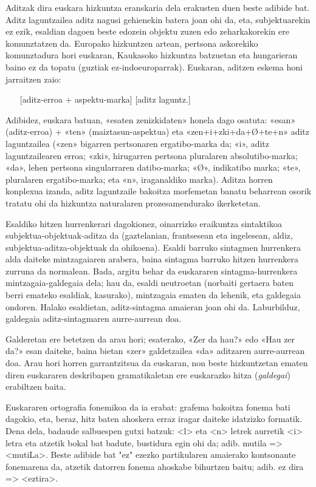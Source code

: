 \begin{multicols}{2}
Aditzak dira euskara hizkuntza eranskaria dela erakusten duen beste adibide bat. Aditz laguntzailea aditz nagusi gehienekin batera joan ohi da, eta, subjektuarekin ez ezik, esaldian dagoen beste edozein objektu zuzen edo zeharkakorekin ere komunztatzen da. Europako hizkuntzen artean, pertsona askorekiko komunztadura hori euskaran, Kaukasoko hizkuntza batzuetan eta hungarieran baino ez da topatu (guztiak ez-indoeuroparrak). Euskaran, aditzen eskema honi jarraitzen zaio:

\begin{itemize}
\item[] [aditz-erroa + aspektu-marka] [aditz laguntz.]
\end{itemize}

Adibidez, euskara batuan, «esaten zenizkidaten» honela dago osatuta: «esan» (aditz-erroa) + «ten» (maiztasun-aspektua) eta «zen+i+zki+da+Ø+te+n» aditz laguntzailea («zen» bigarren pertsonaren ergatibo-marka da; «i», aditz laguntzailearen erroa; «zki», hirugarren pertsona pluralaren absolutibo-marka; «da», lehen pertsona singularraren datibo-marka; «Ø», indikatibo marka; «te», pluralaren ergatibo-marka; eta «n», iraganaldiko marka).  Aditza horren konplexua izanda, aditz laguntzaile bakoitza morfemetan banatu beharrean osorik tratatu ohi da hizkuntza naturalaren prozesamendurako ikerketetan.

Esaldiko hitzen hurrenkerari dagokionez, oinarrizko eraikuntza sintaktikoa subjektua-objektuak-aditza da (gaztelanian, frantsesean eta ingelesean, aldiz, subjektua-aditza-objektuak da ohikoena). Esaldi barruko sintagmen hurrenkera alda daiteke mintzagaiaren arabera, baina sintagma barruko hitzen hurrenkera zurruna da normalean. Bada, argitu behar da euskararen sintagma-hurrenkera mintzagaia-galdegaia dela; hau da, esaldi neutroetan (norbaiti gertaera baten berri emateko esaldiak, kasurako), mintzagaia ematen da lehenik, eta galdegaia ondoren. Halako esaldietan, aditz-sintagma amaieran joan ohi da. Laburbilduz, galdegaia aditz-sintagmaren aurre-aurrean doa. 

Galderetan ere betetzen da arau hori; esaterako, «Zer da hau?» edo «Hau zer da?» esan daiteke, baina bietan «zer» galdetzailea «da» aditzaren aurre-aurrean doa. Arau hori horren garrantzitsua da euskaran, non beste hizkuntzetan ematen diren euskararen deskribapen gramatikaletan ere euskarazko hitza (\textit{galdegai}) erabiltzen baita.

Euskararen ortografia fonemikoa da ia erabat: grafema bakoitza fonema bati dagokio, eta, beraz, hitz baten ahoskera erraz iragar daiteke idatzizko formatik. Dena dela, badaude salbuespen gutxi batzuk: <l> eta <n> letrek aurretik <i> letra eta atzetik bokal bat badute, bustidura egin ohi da; adib. mutila => <mutiLa>. Beste adibide bat "ez" ezezko partikularen amaierako kontsonante fonemarena da, atzetik datorren fonema ahoskabe bihurtzen baitu; adib. ez dira => <eztira>.


\end{multicols}
